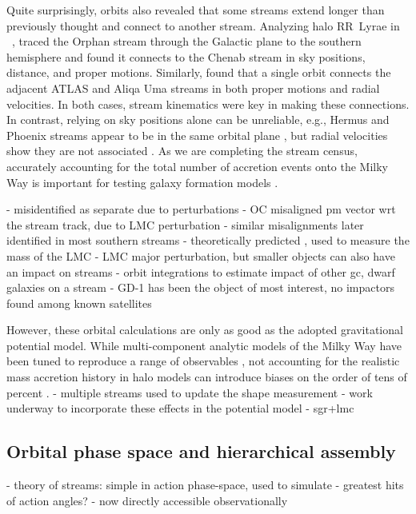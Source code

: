 \documentclass[final,5p,times,twocolumn,authoryear]{elsarticle}
\begin{document}
Quite surprisingly, orbits also revealed that some streams extend longer than previously thought and connect to another stream.
Analyzing halo RR~Lyrae in \gaia~, \citet{koposov:2019} traced the Orphan stream through the Galactic plane to the southern hemisphere and found it connects to the Chenab stream in sky positions, distance, and proper motions.
Similarly, \citet{li:2021} found that a single orbit connects the adjacent ATLAS and Aliqa Uma streams in both proper motions and radial velocities.
In both cases, stream kinematics were key in making these connections.
In contrast, relying on sky positions alone can be unreliable, e.g., Hermus and Phoenix streams appear to be in the same orbital plane \citep{grillmair:2016b}, but radial velocities show they are not associated \citep{martin:2018}.
As we are completing the stream census, accurately accounting for the total number of accretion events onto the Milky Way is important for testing galaxy formation models \citep{pillepich:2015, shipp:2023, wright:2023, khoperskov:2023}.

- misidentified as separate due to perturbations
- OC misaligned pm vector wrt the stream track, due to LMC perturbation \citep{erkal}
- similar misalignments later identified in most southern streams \citep{shipp:2019}
- theoretically predicted \citep{garavito-camargo, lilleengen}, used to measure the mass of the LMC \citep{shipp, koposov}
- LMC major perturbation, but smaller objects can also have an impact on streams
- orbit integrations to estimate impact of other gc, dwarf galaxies on a stream \citep{bonaca:2019,}
- GD-1 has been the object of most interest, no impactors found among known satellites

However, these orbital calculations are only as good as the adopted gravitational potential model.
While multi-component analytic models of the Milky Way have been tuned to reproduce a range of observables \citep[e.g.,][]{mcmillan,bovy,price-whelan}, not accounting for the realistic mass accretion history in halo models can introduce biases on the order of tens of percent \citep[e.g.,][]{bonaca:2014, dsouza:2022, santistevan:2024}.
- multiple streams used to update the shape measurement \citep{palau,}
- work underway to incorporate these effects in the potential model
- sgr+lmc \citep{tango, correa-magnus:2022}


\subsection{Orbital phase space and hierarchical assembly}
- theory of streams: simple in action phase-space, used to simulate
- greatest hits of action angles?
- now directly accessible observationally
\end{document}
